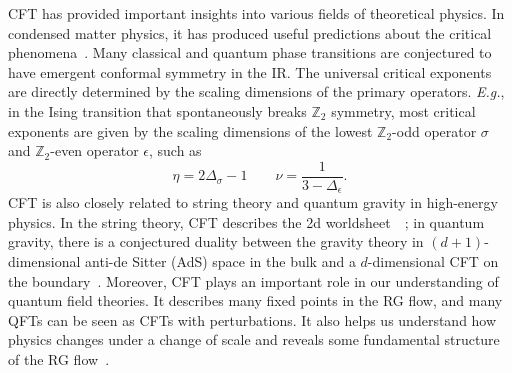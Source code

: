 \documentclass{timesjhep}
\begin{document}
CFT has provided important insights into various fields of theoretical physics. In condensed matter physics, it has produced useful predictions about the critical phenomena~\cite{Polyakov1970Conformal,Cardy1996Scaling,Sachdev2011Quantum}. Many classical and quantum phase transitions are conjectured to have emergent conformal symmetry in the IR. The universal critical exponents are directly determined by the scaling dimensions of the primary operators. \textit{E.g.}, in the Ising transition that spontaneously breaks $\mathbb{Z}_2$ symmetry, most critical exponents are given by the scaling dimensions of the lowest $\mathbb{Z}_2$-odd operator $\sigma$ and $\mathbb{Z}_2$-even operator $\epsilon$, such as 
\begin{equation}
    \eta=2\Delta_\sigma-1\qquad\nu=\frac{1}{3-\Delta_\epsilon}.
\end{equation} 
CFT is also closely related to string theory and quantum gravity in high-energy physics. In the string theory, CFT describes the 2d worldsheet~\cite{Polchinski1998String}~; in quantum gravity, there is a conjectured duality between the gravity theory in $(d+1)$-dimensional anti-de Sitter (AdS) space in the bulk and a $d$-dimensional CFT on the boundary~\cite{Maldacena1998AdSCFT}. Moreover, CFT plays an important role in our understanding of quantum field theories. It describes many fixed points in the RG flow, and many QFTs can be seen as CFTs with perturbations. It also helps us understand how physics changes under a change of scale and reveals some fundamental structure of the RG flow~\cite{Zamolodchikov1986Irreversibility}. 
\end{document}
